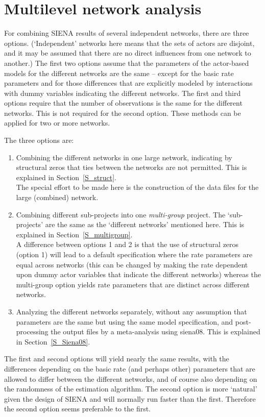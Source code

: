 \documentclass[a4paper,fleqn]{article}
\newcommand{\+}{\, + \,}
\newcommand{\SI}{{\sf SIENA }}
\begin{document}
{\newpage
\section{Multilevel network analysis}
\label{S_mulev}

For combining \SI results of several independent networks,
there are three options.
(`Independent'  networks here means that the sets of actors are
disjoint, and it may be assumed that there are no direct influences
from one network to another.)
The first two options assume that the parameters
of the actor-based models for the different
networks are the same -- except
for the basic rate parameters and for
those differences that are explicitly modeled by interactions
with dummy variables indicating the different networks.
The first and third options require that the number of observations is the same
for the different networks. This is not required for the
second option.
These methods can be applied for two or more networks.
\medskip

\noindent
The three options are:
\begin{enumerate}
\item Combining the different networks in one large network,
      indicating by structural zeros that ties between the
      networks are not permitted. This is explained in Section~\ref{S_struct}.\\
      The special effort to be made here is the construction
      of the data files for the large (combined) network.
\item Combining different sub-projects
      into one \emph{multi-group} project.
      The `sub-projects' are the same as the `different networks'
      mentioned here.
      This is explained in Section~\ref{S_multigroup}.\\
      A difference between options 1 and 2 is that the use
      of structural zeros (option 1) will lead to a default specification
      where the rate parameters are equal across networks
      (this can be changed by making the rate dependent upon dummy actor
      variables that indicate the different networks)
      whereas the multi-group option yields rate parameters
      that are distinct across different networks.
\item Analyzing the different networks separately, without any assumption
      that parameters are the same but using the same model specification,
      and post-processing the output files by a meta-analysis
      using \textsf{siena08}.
      This is explained in Section~\ref{S_Siena08}.
\end{enumerate}
The first and second options will yield nearly the same results, with the
differences depending on the basic rate (and perhaps other) parameters that are
allowed to differ between the different networks, and of course
also depending on the randomness of the estimation algorithm.
The second option is more `natural' given the design of \SI and
will normally run faster than the first.
Therefore the second option seems preferable to the first.

}
\end{document}

